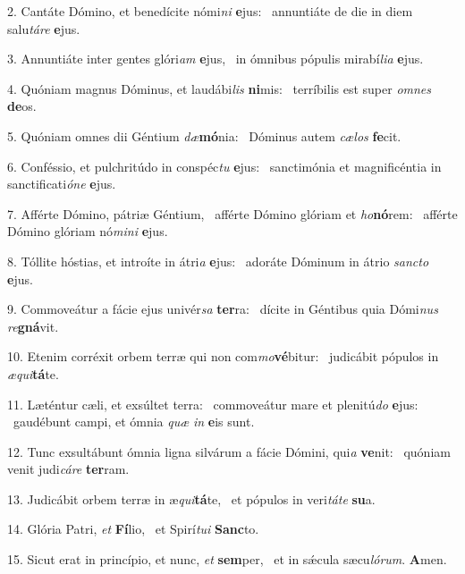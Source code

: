2. Cantáte Dómino, et benedícite nómi\textit{ni} \textbf{e}jus: \ast\  annuntiáte de die in diem salu\textit{tá}\textit{re} \textbf{e}jus.\

3. Annuntiáte inter gentes glóri\textit{am} \textbf{e}jus, \ast\  in ómnibus pópulis mirabí\textit{li}\textit{a} \textbf{e}jus.\

4. Quóniam magnus Dóminus, et laudábi\textit{lis} \textbf{ni}mis: \ast\  terríbilis est super \textit{om}\textit{nes} \textbf{de}os.\

5. Quóniam omnes dii Géntium \textit{dæ}\textbf{mó}nia: \ast\  Dóminus autem \textit{cæ}\textit{los} \textbf{fe}cit.\

6. Conféssio, et pulchritúdo in conspéc\textit{tu} \textbf{e}jus: \ast\  sanctimónia et magnificéntia in sanctificati\textit{ó}\textit{ne} \textbf{e}jus.\

7. Afférte Dómino, pátriæ Géntium, \dag\  afférte Dómino glóriam et \textit{ho}\textbf{nó}rem: \ast\  afférte Dómino glóriam nó\textit{mi}\textit{ni} \textbf{e}jus.\

8. Tóllite hóstias, et introíte in átri\textit{a} \textbf{e}jus: \ast\  adoráte Dóminum in átrio \textit{sanc}\textit{to} \textbf{e}jus.\

9. Commoveátur a fácie ejus univér\textit{sa} \textbf{ter}ra: \ast\  dícite in Géntibus quia Dómi\textit{nus} \textit{re}\textbf{gná}vit.\

10. Etenim corréxit orbem terræ qui non com\textit{mo}\textbf{vé}bitur: \ast\  judicábit pópulos in \textit{æ}\textit{qui}\textbf{tá}te.\

11. Læténtur cæli, et exsúltet terra: \dag\  commoveátur mare et plenitú\textit{do} \textbf{e}jus: \ast\  gaudébunt campi, et ómnia \textit{quæ} \textit{in} \textbf{e}is sunt.\

12. Tunc exsultábunt ómnia ligna silvárum a fácie Dómini, qui\textit{a} \textbf{ve}nit: \ast\  quóniam venit judi\textit{cá}\textit{re} \textbf{ter}ram.\

13. Judicábit orbem terræ in æ\textit{qui}\textbf{tá}te, \ast\  et pópulos in veri\textit{tá}\textit{te} \textbf{su}a.\

14. Glória Patri, \textit{et} \textbf{Fí}lio, \ast\  et Spirí\textit{tu}\textit{i} \textbf{Sanc}to.\

15. Sicut erat in princípio, et nunc, \textit{et} \textbf{sem}per, \ast\  et in sǽcula sæcu\textit{ló}\textit{rum}. \textbf{A}men.\

